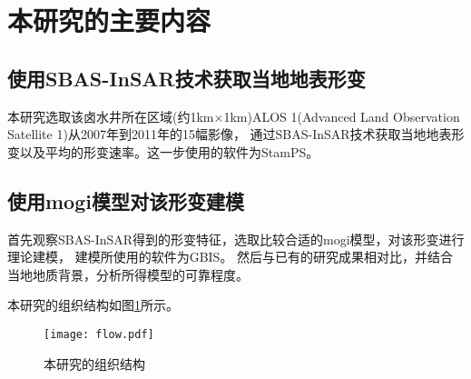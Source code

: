 \section{本研究的主要内容}

\subsection{使用SBAS-InSAR技术获取当地地表形变}
本研究选取该卤水井所在区域(约1km×1km)ALOS 1(Advanced Land Observation Satellite 1)从2007年到2011年的15幅影像，
通过SBAS-InSAR技术获取当地地表形变以及平均的形变速率。这一步使用的软件为StamPS。

\subsection{使用mogi模型对该形变建模}
首先观察SBAS-InSAR得到的形变特征，选取比较合适的mogi模型，对该形变进行理论建模，
建模所使用的软件为GBIS。
然后与已有的研究成果相对比，并结合当地地质背景，分析所得模型的可靠程度。

本研究的组织结构如图\ref{fig:flow}所示。
\begin{figure}[htb]
  \centering
  \texttt{[image: flow.pdf]}
  \caption{本研究的组织结构}
  \label{fig:flow}
\end{figure}